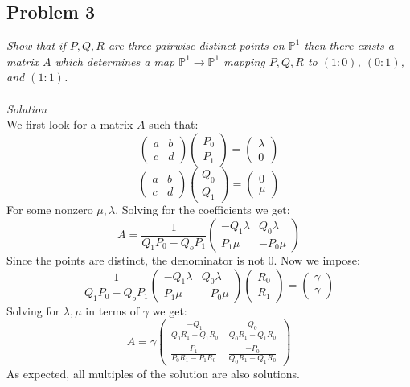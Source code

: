 \documentclass[12 pt]{article}
\begin{document}
\subsection*{Problem 3}
\emph{Show that if $P, Q, R$ are three pairwise distinct points on $\mathbb{P}^1$ then there exists a matrix $A$ which determines a map $\mathbb{P}^1 \to \mathbb{P}^1$ mapping $P, Q, R$ to $(1 : 0)$, $(0 : 1)$, and $(1 : 1)$.}
\\
\\
\emph{Solution}
\\
We first look for a matrix $A$ such that:
\[      \left(  \begin{array}  {cc} a & b \\ c & d \end{array} \right)  \left(  \begin{array}  {c} P_0 \\ P_1 \end{array} \right)  =  \left(  \begin{array}  {c} \lambda \\ 0 \end{array} \right)  \]
\[      \left(  \begin{array}  {cc} a & b \\ c & d \end{array} \right)  \left(  \begin{array}  {c} Q_0 \\ Q_1 \end{array} \right)  =  \left(  \begin{array}  {c} 0 \\ \mu \end{array} \right)  \]
For some nonzero $\mu, \lambda$. Solving for the coefficients we get:
\[    A = \frac{1}{Q_1 P_0 - Q_o P_1} \left(  \begin{array}  {cc} -Q_1 \lambda & Q_0 \lambda \\ P_1 \mu & -P_0 \mu \end{array} \right)  \]
Since the points are distinct, the denominator is not 0. Now we impose:
\[      \frac{1}{Q_1 P_0 - Q_o P_1} \left(  \begin{array}  {cc} -Q_1 \lambda & Q_0 \lambda \\ P_1 \mu & -P_0 \mu \end{array} \right)   \left(  \begin{array}  {c} R_0 \\ R_1 \end{array} \right)  =  \left(  \begin{array}  {c} \gamma \\ \gamma \end{array} \right)      \]
Solving for $\lambda, \mu$ in terms of $\gamma$ we get:
\[     A = \gamma   \left(  \begin{array}  {cc} \frac{-Q_1}{Q_0R_1 - Q_1R_0} & \frac{Q_0}{Q_0R_1 - Q_1R_0} \\ \frac{P_1}{P_0R_1 - P_1R_0} & \frac{-P_0}{Q_0R_1 - Q_1R_0} \end{array} \right)  \]
As expected, all multiples of the solution are also solutions.
\end{document}
